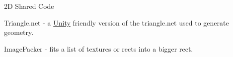 2D Shared Code


\begin{DoxyItemize}
\item Triangle.\+net -\/ a \mbox{\hyperlink{namespace_unity}{Unity}} friendly version of the triangle.\+net used to generate geometry.
\item Image\+Packer -\/ fits a list of textures or rects into a bigger rect. 
\end{DoxyItemize}